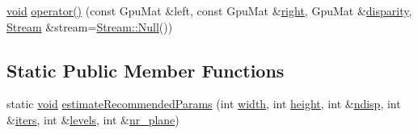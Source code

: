 \begin{DoxyCompactItemize}
\item 
\hyperlink{legacy_8hpp_a8bb47f092d473522721002c86c13b94e}{void} \hyperlink{classcv_1_1gpu_1_1StereoConstantSpaceBP_a91fa63e9b4deac076a0fa96be86a46a9}{operator()} (const Gpu\-Mat \&left, const Gpu\-Mat \&\hyperlink{legacy_8hpp_a6b04b878081bf724144b73c75dfd1894}{right}, Gpu\-Mat \&\hyperlink{calib3d_8hpp_acd2ef073a3a4984e0a0ebac5c7e179fd}{disparity}, \hyperlink{classcv_1_1gpu_1_1Stream}{Stream} \&stream=\hyperlink{classcv_1_1gpu_1_1Stream_af96c23564834f88333dcb8997df553f1}{Stream\-::\-Null}())
\end{DoxyCompactItemize}
\subsection*{Static Public Member Functions}
\begin{DoxyCompactItemize}
\item 
static \hyperlink{legacy_8hpp_a8bb47f092d473522721002c86c13b94e}{void} \hyperlink{classcv_1_1gpu_1_1StereoConstantSpaceBP_a7cffa16a7b6acc15ba1ae35ef39533f9}{estimate\-Recommended\-Params} (int \hyperlink{highgui__c_8h_a2474a5474cbff19523a51eb1de01cda4}{width}, int \hyperlink{highgui__c_8h_adc7b4b8a6ef510e136071efbc9cd9a58}{height}, int \&\hyperlink{classcv_1_1gpu_1_1StereoConstantSpaceBP_ad581f8f942bce3c65131ef5db9051dd3}{ndisp}, int \&\hyperlink{classcv_1_1gpu_1_1StereoConstantSpaceBP_a259939bb24dd2f1de48e718e9b7d4f5e}{iters}, int \&\hyperlink{classcv_1_1gpu_1_1StereoConstantSpaceBP_a343113cd7fac638c7bbdb0e8854e4416}{levels}, int \&\hyperlink{classcv_1_1gpu_1_1StereoConstantSpaceBP_a75c85050ba1c024997ff44dcd05593e4}{nr\-\_\-plane})
\end{DoxyCompactItemize}
